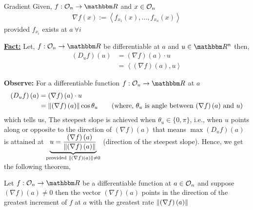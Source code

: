 \documentclass[Analysis-3]{subfiles}
\begin{document}
\begin{Def}{Gradient}{}
  Given, $ f:\Op{n}\to\R $ and $ x\in\mathcal{O}_{n} $
  \begin{align*}
    \nabla f(x) := \left\langle f_{x_1}(x), \ldots, f_{x_n}(x) \right\rangle
  \end{align*}
  provided $ f_{x_i} $ exists at $ a \ \forall i $
\end{Def}

\textbf{\underline{Fact:}} Let, $ f:\Op{n}\to\R $ be differentiable at $ a $ and $ u\in\R^n $ then,
\begin{align*}
  \left( D_uf \right)(u) & = \left( \nabla f\right)\left( a \right)\cdot u \\ &= \left\langle \left( \nabla f \right)\left( a \right), u \right\rangle
\end{align*}

\textbf{Observe:} For a differentiable function $ f: \Op{n} \to \R $ at $ a $
\begin{align*}
  \left( D_uf \right)\left( a \right) & = \left( \nabla f\right)\left( a \right)\cdot u                                                                                                         \\
                                      & = \norm{\left( \nabla f\right)\left( a \right)}\cos{\theta_u} \tag{where, $\theta_u$ is angle between $\left( \nabla f\right)\left( a \right)$ and $u$}
\end{align*}
which tells us, The steepest slope is achieved when $ \theta_u \in \{0, \pi\} $, i.e., when $ u $ points along or opposite to the direction of $ \left( \nabla f\right)\left( a \right) $
that means $ \max \left( D_uf \right)\left( a \right) $ is attained at $ \underbrace{u = \frac{\left( \nabla f\right)\left( a \right)}{\norm{\left( \nabla f\right)\left( a \right)}}}_{\text{provided } \norm{\left( \nabla f\right)\left( a \right)} \not=0 } $ (direction of the steepest slope).
Hence, we get the following theorem,
\begin{Thm}{}{}
  Let $ f: \Op{n} \to \R $ be a differentiable function at $ a \in \mathcal{O}_{n} $ and suppose $ \left( \nabla f\right)\left( a \right) \not= 0 $ then the vector $\left( \nabla f\right)\left( a \right)$ points in the direction of the greatest increment of $ f $ at $ a $ with the greatest rate $ \norm{\left( \nabla f\right)\left( a \right)} $
\end{Thm}
\end{document}
